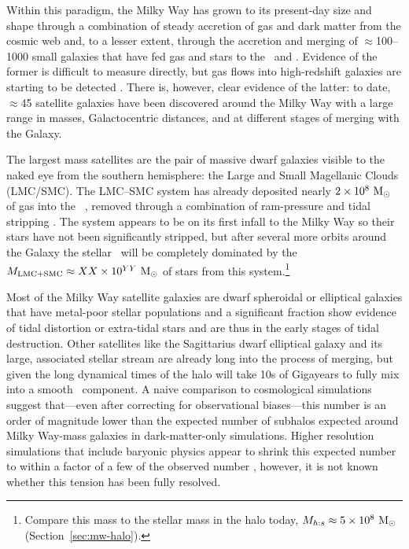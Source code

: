 Within this paradigm, the Milky Way has grown to its present-day size and shape
through a combination of steady accretion of gas and dark matter from the cosmic
web and, to a lesser extent, through the accretion and merging of $\approx$100--
1000 small galaxies that have fed gas and stars to the \mwdisk\ and \mwhalo.
Evidence of the former is difficult to measure directly, but gas flows into
high-redshift galaxies are starting to be detected \citep{martinc15}. There is,
however, clear evidence of the latter: to date, $\approx$45 satellite galaxies
have been discovered around the Milky Way with a large range in masses,
Galactocentric distances, and at different stages of merging with the Galaxy.

The largest mass satellites are the pair of massive dwarf galaxies visible to
the naked eye from the southern hemisphere: the Large and Small Magellanic
Clouds (LMC/SMC). The LMC--SMC system has already deposited nearly $2 \times
10^{8}~\mathrm{M}_\odot$ of gas into the \mwhalo\ \citep{putman03}, removed through a
combination of ram-pressure and tidal stripping \citep{salem15}. The system
appears to be on its first infall to the Milky Way \citep{besla10} so their
stars have not been significantly stripped, but after several more orbits around
the Galaxy the stellar \mwhalo\ will be completely dominated by the $M_{\rm
LMC+SMC} \approx XX \times 10^{YY}~\mathrm{M}_\odot$ of stars from this
system.\footnote{Compare this mass to the stellar mass in the halo today,
$M_{h:s} \approx 5 \times 10^8~\mathrm{M}_\odot$ (Section~\ref{sec:mw-halo}).}

Most of the Milky Way satellite galaxies are dwarf spheroidal or elliptical
galaxies that have metal-poor stellar populations and a significant fraction
show evidence of tidal distortion or extra-tidal stars
\citep[e.g.,][]{belokurov07c, coleman07} and are thus in the early stages of
tidal destruction. Other satellites like the Sagittarius dwarf elliptical galaxy
and its large, associated stellar stream are already long into the process of
merging, but given the long dynamical times of the halo will take 10s of
Gigayears to fully mix into a smooth \mwhalo\ component. A naive comparison to
cosmological simulations suggest that---even after correcting for observational
biases---this number is an order of magnitude lower than the expected number of
subhalos expected around Milky Way-mass galaxies in dark-matter-only
simulations. Higher resolution simulations that include baryonic physics appear
to shrink this expected number to within a factor of a few of the observed
number \citep[e.g.,][]{zolotov12, brooks13,sawala16}, however, it is not known
whether this tension has been fully resolved.

